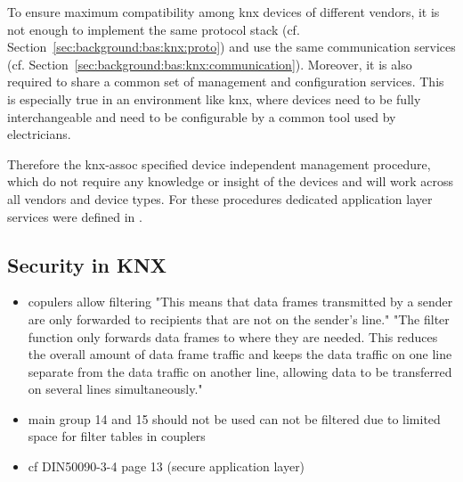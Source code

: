 To ensure maximum compatibility among \gls{knx} devices of different vendors, it is not enough to implement the same protocol stack (cf. Section~\ref{sec:background:bas:knx:proto}) and use the same communication services (cf. Section~\ref{sec:background:bas:knx:communication}).
Moreover, it is also required to share a common set of management and configuration services.
This is especially true in an environment like \gls{knx}, where devices need to be fully interchangeable and need to be configurable by a common tool used by electricians.

Therefore the \gls{knx-assoc} specified device independent management procedure, which do not require any knowledge or insight of the devices and will work across all vendors and device types. \parencite{DIN_EN_50090-7-1}
For these procedures dedicated application layer services were defined in \textcite{DIN_EN_50090-4-1}.
	
\subsection{Security in KNX}
	\begin{itemize}
		\item copulers allow filtering 
			\subitem "This means that data frames transmitted by a sender are only forwarded to recipients that are not on the sender’s line." \parencite{Merz2009}
			\subitem "The filter function only forwards data frames to where they are needed. This reduces the overall amount of data frame traffic and keeps the data traffic on one line separate from the data traffic on another line, allowing data to be transferred on several lines simultaneously." \parencite{Merz2009}
		\item main group 14 and 15 should not be used \parencite{Hubner2009}
			\subitem can not be filtered due to limited space for filter tables in couplers \parencite{Hubner2009}
			
		\item cf DIN50090-3-4 page 13 (secure application layer)
	\end{itemize}

\section{\lonworks}

\section{\bacnet}